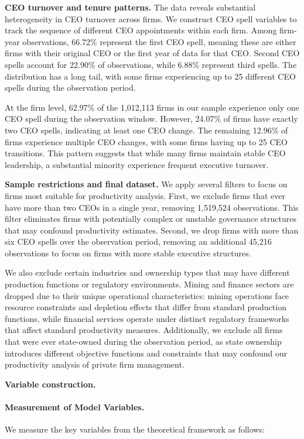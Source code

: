 \documentclass[11pt,a4paper]{article}
\begin{document}
\textbf{CEO turnover and tenure patterns.} The data reveals substantial heterogeneity in CEO turnover across firms. We construct CEO spell variables to track the sequence of different CEO appointments within each firm. Among firm-year observations, 66.72\% represent the first CEO spell, meaning these are either firms with their original CEO or the first year of data for that CEO. Second CEO spells account for 22.90\% of observations, while 6.88\% represent third spells. The distribution has a long tail, with some firms experiencing up to 25 different CEO spells during the observation period.

At the firm level, 62.97\% of the 1,012,113 firms in our sample experience only one CEO spell during the observation window. However, 24.07\% of firms have exactly two CEO spells, indicating at least one CEO change. The remaining 12.96\% of firms experience multiple CEO changes, with some firms having up to 25 CEO transitions. This pattern suggests that while many firms maintain stable CEO leadership, a substantial minority experience frequent executive turnover.

\textbf{Sample restrictions and final dataset.} We apply several filters to focus on firms most suitable for productivity analysis. First, we exclude firms that ever have more than two CEOs in a single year, removing 1,519,524 observations. This filter eliminates firms with potentially complex or unstable governance structures that may confound productivity estimates. Second, we drop firms with more than six CEO spells over the observation period, removing an additional 45,216 observations to focus on firms with more stable executive structures.

We also exclude certain industries and ownership types that may have different production functions or regulatory environments. Mining and finance sectors are dropped due to their unique operational characteristics: mining operations face resource constraints and depletion effects that differ from standard production functions, while financial services operate under distinct regulatory frameworks that affect standard productivity measures. Additionally, we exclude all firms that were ever state-owned during the observation period, as state ownership introduces different objective functions and constraints that may confound our productivity analysis of private firm management.

\textbf{Variable construction.} 
\paragraph{Measurement of Model Variables.} We measure the key variables from the theoretical framework as follows:
\end{document}
